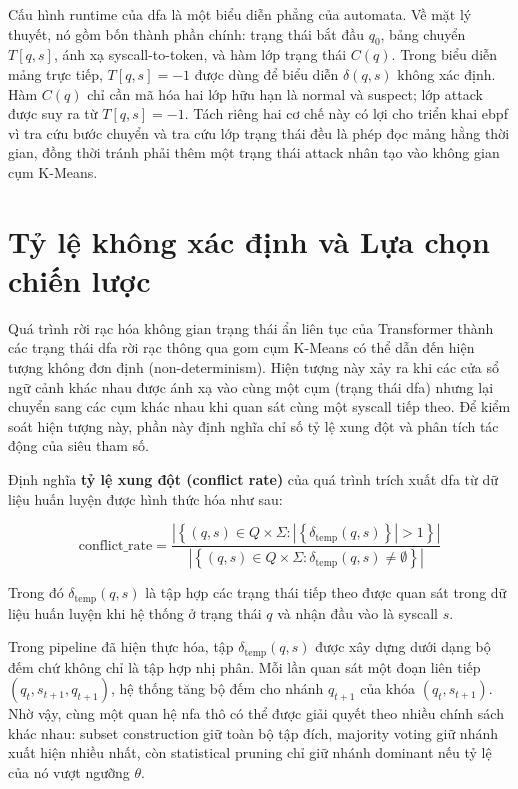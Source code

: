 \documentclass[../main.tex]{subfiles}
\begin{document}
Cấu hình runtime của \gls{dfa} là một biểu diễn phẳng của automata. Về mặt
lý thuyết, nó gồm
bốn thành phần chính: trạng thái bắt đầu $q_0$, bảng chuyển $T[q,s]$, ánh xạ
\gls{syscall}-to-token, và hàm lớp trạng thái $C(q)$. Trong biểu diễn mảng trực tiếp,
$T[q,s] = -1$ được dùng để biểu diễn $\delta(q,s)$ không xác định.
Hàm $C(q)$ chỉ cần
mã hóa hai lớp hữu hạn là normal và suspect; lớp attack được suy ra từ
$T[q,s] = -1$. Tách riêng hai cơ chế này có lợi cho triển khai \gls{ebpf}
vì tra cứu bước
chuyển và tra cứu lớp trạng thái đều là phép đọc mảng hằng thời gian,
đồng thời tránh
phải thêm một trạng thái attack nhân tạo vào không gian cụm K-Means.

\section{Tỷ lệ không xác định và Lựa chọn chiến lược}
\label{sec:conflict_rate_policy}

Quá trình rời rạc hóa không gian trạng thái ẩn liên tục của
Transformer thành các trạng thái \gls{dfa} rời rạc thông qua gom cụm
K-Means có thể dẫn đến hiện tượng không đơn định (non-determinism).
Hiện tượng này xảy ra khi các cửa sổ ngữ cảnh khác nhau được ánh xạ
vào cùng một cụm (trạng thái \gls{dfa}) nhưng lại chuyển sang các cụm khác
nhau khi quan sát cùng một \gls{syscall} tiếp theo. Để kiểm soát hiện tượng
này, phần này định nghĩa chỉ số tỷ lệ xung đột và phân tích tác động
của siêu tham số.

Định nghĩa \textbf{tỷ lệ xung đột (conflict rate)} của quá trình
trích xuất \gls{dfa} từ dữ liệu huấn luyện được hình thức hóa như sau:

\begin{equation}
  \label{eq:conflict_rate}
  \text{conflict\_rate} = \frac{\left|\left\{(q, s) \in Q \times
      \Sigma : \left|\left\{\delta_{\text{temp}}(q, s)\right\}\right| >
  1\right\}\right|}{\left|\left\{(q, s) \in Q \times \Sigma :
  \delta_{\text{temp}}(q, s) \neq \emptyset\right\}\right|}
\end{equation}

Trong đó $\delta_{\text{temp}}(q, s)$ là tập hợp các trạng thái tiếp
theo được quan sát trong dữ liệu huấn luyện khi hệ thống ở trạng thái
$q$ và nhận đầu vào là \gls{syscall} $s$.

Trong pipeline đã hiện thực hóa, tập $\delta_{\text{temp}}(q,s)$ được
xây dựng dưới
dạng bộ đếm chứ không chỉ là tập hợp nhị phân. Mỗi lần quan sát một
đoạn liên tiếp
$(q_t,s_{t+1},q_{t+1})$, hệ thống tăng bộ đếm cho nhánh $q_{t+1}$ của
khóa $(q_t,s_{t+1})$.
Nhờ vậy, cùng một quan hệ \gls{nfa} thô có thể được giải quyết theo nhiều
chính sách khác
nhau: subset construction giữ toàn bộ tập đích, majority voting giữ
nhánh xuất hiện
nhiều nhất, còn statistical pruning chỉ giữ nhánh dominant nếu tỷ lệ
của nó vượt ngưỡng
$\theta$.
\end{document}
